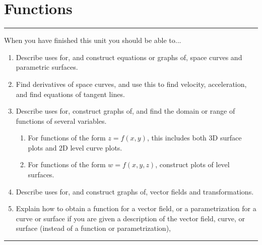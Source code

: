 \documentclass[10pt,]{book}
\theoremstyle{plain}
\theoremstyle{definition}
\theoremstyle{definition}
\theoremstyle{definition}
\theoremstyle{definition}
\newenvironment{objectives}[1]{\noindent\rule{\linewidth}{0.1ex}\newline{\textbf{{\large#1}}\par\smallskip}}{\par\noindent\rule{\linewidth}{0.1ex}\par\smallskip}
\theoremstyle{definition}
\numberwithin{equation}{section}
\begin{document}
\chapter[{Functions}]{Functions}\label{chapter-6}
\begin{objectives}{Objectives}\label{objectives-9}
When you have finished this unit you should be able to...%
%
\begin{enumerate}
\item\hypertarget{li-46}{}Describe uses for, and construct equations or graphs of, space curves and parametric surfaces.%
\item\hypertarget{li-47}{}Find derivatives of space curves, and use this to find velocity, acceleration, and find equations of tangent lines.%
\item\hypertarget{li-48}{}Describe uses for, construct graphs of, and find the domain or range of functions of several variables. %
\begin{enumerate}
\item\hypertarget{li-49}{}For functions of the form \(z=f(x,y)\), this includes both 3D surface plots and 2D level curve plots.%
\item\hypertarget{li-50}{}For functions of the form \(w=f(x,y,z)\), construct plots of level surfaces.%
\end{enumerate}
%
\item\hypertarget{li-51}{}Describe uses for, and construct graphs of, vector fields and transformations.%
\item\hypertarget{li-52}{}Explain how to obtain a function for a vector field, or a parametrization for a curve or surface if you are given a description of the vector field, curve, or surface (instead of a function or parametrization),%
\end{enumerate}
\end{objectives}
\typeout{************************************************}
\typeout{************************************************}
\end{document}
